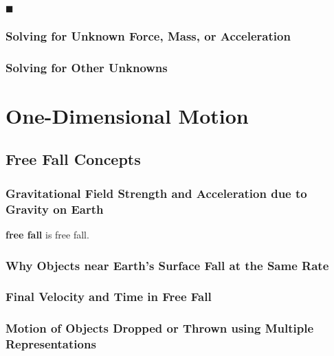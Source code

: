\documentclass[dvipsnames]{article}
\newif\ifShowUnitVI                              %
\begin{document}
\hfill $\blacksquare$

\subsubsection{Solving for Unknown Force, Mass, or Acceleration}

\subsubsection{Solving for Other Unknowns}



\fi

\clearpage


\section{One-Dimensional Motion}

\ifShowUnitVI

\subsection{Free Fall Concepts}

\subsubsection{Gravitational Field Strength and Acceleration due to Gravity on Earth}


\textbf{\Gls{free fall}} is \glsdesc{free fall}.

\subsubsection{Why Objects near Earth's Surface Fall at the
Same Rate}



\subsubsection{Final Velocity and Time in Free Fall}



\subsubsection{Motion of Objects Dropped or Thrown using Multiple Representations}
\end{document}
